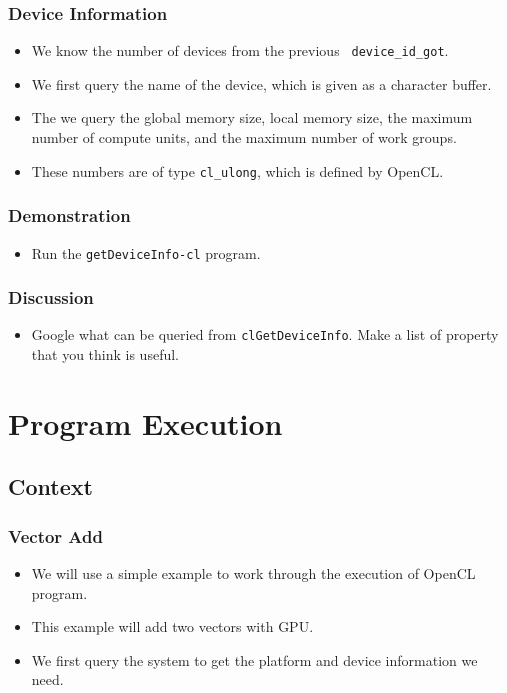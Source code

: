 \documentclass{beamer}
\begin{document}
\begin{frame}
\end{frame}

\begin{frame}
  \frametitle{Device Information}
  \begin{itemize}
  \item We know the number of devices from the previous {\tt
    device\_id\_got}.
  \item We first query the name of the device, which is given as a
    character buffer.
  \item The we query the global memory size, local memory size, the
    maximum number of compute units, and the maximum number of
    work groups.
  \item These numbers are of type {\tt cl\_ulong}, which is defined by
    OpenCL.
  \end{itemize}
\end{frame}

\begin{frame}
  \frametitle{Demonstration}
  \begin{itemize}
  \item Run the {\tt getDeviceInfo-cl} program.
  \end{itemize}
\end{frame}

\begin{frame}
  \frametitle{Discussion}
  \begin{itemize}
  \item Google what can be queried from {\tt clGetDeviceInfo}.  Make a
    list of property that you think is useful.
  \end{itemize}
\end{frame}

\section{Program Execution}

\subsection{Context}

\begin{frame}
  \frametitle{Vector Add}
  \begin{itemize}
  \item We will use a simple example to work through the execution
    of OpenCL program.
  \item This example will add two vectors with GPU.
  \item We first query the system to get the platform and device
    information we need.
  \end{itemize}
\end{frame}
\end{document}
